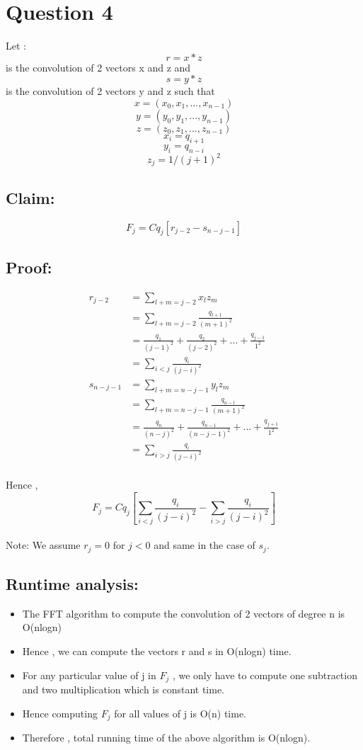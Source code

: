 \documentclass[11pt]{article}
\begin{document}
\section*{Question 4}
Let : 
\[r = x * z \] is the convolution of 2 vectors x and z and \\
\[s = y * z \] is the convolution of 2 vectors y and z such that
\[x = (x_{0},x_{1},...,x_{n-1})\]
\[y = (y_{0},y_{1},...,y_{n-1})\]
\[z = (z_{0},z_{1},...,z_{n-1})\]
\[x_{i} = q_{i+1}\]
\[y_{i} = q_{n-i}\]
\[z_{j} = 1/(j+1)^2\]

\subsection*{Claim:} \[F_j = Cq_j[r_{j-2} - s_{n-j-1}]\]

\subsection*{Proof:}
\begin{align*}
r_{j-2} & = \sum_{l+m=j-2} x_lz_m \\
&= \sum_{l+m=j-2} \frac{q_{l+1}}{(m+1)^2} \\
&= \frac{q_1}{(j-1)^2} + \frac{q_2}{(j-2)^2} + ... + \frac{q_{j-1}}{1^2} \\
&= \sum_{i<j} \frac{q_i}{(j-i)^2} \\
s_{n-j-1} & = \sum_{l+m=n-j-1} y_lz_m \\
&= \sum_{l+m=n-j-1} \frac{q_{n-l}}{(m+1)^2} \\
&= \frac{q_n}{(n-j)^2} + \frac{q_{n-1}}{(n-j-1)^2} + ... + \frac{q_{j+1}}{1^2} \\
&= \sum_{i>j} \frac{q_i}{(j-i)^2} \\ 
\end{align*}

Hence , 
\[F_j = Cq_j[\sum_{i<j} \frac{q_{i}}{(j-i)^2} - \sum_{i>j} \frac{q_{i}}{(j-i)^2}  ]\] 
\\
Note: We assume $r_j = 0$ for $j < 0$ and same in the case of $s_j$.

\subsection*{Runtime analysis:}
\begin{itemize}
\item The FFT algorithm to compute the convolution of 2 vectors of degree n is O(nlogn)
\item Hence , we can compute the vectors r and s in O(nlogn) time.
\item For any particular value of j in $F_j$ , we only have to compute one subtraction and two multiplication which is constant time. 
\item Hence computing $F_j$ for all values of j is O(n) time. 
\item Therefore , total running time of the above algorithm is O(nlogn).
\end{itemize}
\end{document}
